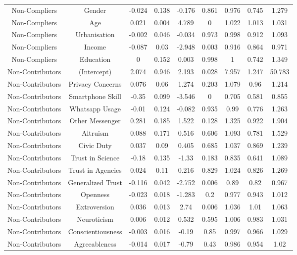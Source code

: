 \begin{table}[!htbp]
\begin{tabular}{@{\extracolsep{5pt}} ccccccccc}
Non-Compliers & Gender & -0.024 & 0.138 & -0.176 & 0.861 & 0.976 & 0.745 & 1.279 \\ 
Non-Compliers & Age & 0.021 & 0.004 & 4.789 & 0 & 1.022 & 1.013 & 1.031 \\ 
Non-Compliers & Urbanisation & -0.002 & 0.046 & -0.034 & 0.973 & 0.998 & 0.912 & 1.093 \\ 
Non-Compliers & Income & -0.087 & 0.03 & -2.948 & 0.003 & 0.916 & 0.864 & 0.971 \\ 
Non-Compliers & Education & 0 & 0.152 & 0.003 & 0.998 & 1 & 0.742 & 1.349 \\ 
Non-Contributors & (Intercept) & 2.074 & 0.946 & 2.193 & 0.028 & 7.957 & 1.247 & 50.783 \\ 
Non-Contributors & Privacy Concerns & 0.076 & 0.06 & 1.274 & 0.203 & 1.079 & 0.96 & 1.214 \\ 
Non-Contributors & Smartphone Skill & -0.35 & 0.099 & -3.546 & 0 & 0.705 & 0.581 & 0.855 \\ 
Non-Contributors & Whatsapp Usage & -0.01 & 0.124 & -0.082 & 0.935 & 0.99 & 0.776 & 1.263 \\ 
Non-Contributors & Other Messenger & 0.281 & 0.185 & 1.522 & 0.128 & 1.325 & 0.922 & 1.904 \\ 
Non-Contributors & Altruism & 0.088 & 0.171 & 0.516 & 0.606 & 1.093 & 0.781 & 1.529 \\ 
Non-Contributors & Civic Duty & 0.037 & 0.09 & 0.405 & 0.685 & 1.037 & 0.869 & 1.239 \\ 
Non-Contributors & Trust in Science & -0.18 & 0.135 & -1.33 & 0.183 & 0.835 & 0.641 & 1.089 \\ 
Non-Contributors & Trust in Agencies & 0.024 & 0.11 & 0.216 & 0.829 & 1.024 & 0.826 & 1.269 \\ 
Non-Contributors & Generalized Trust & -0.116 & 0.042 & -2.752 & 0.006 & 0.89 & 0.82 & 0.967 \\ 
Non-Contributors & Openness & -0.023 & 0.018 & -1.283 & 0.2 & 0.977 & 0.943 & 1.012 \\ 
Non-Contributors & Extroversion & 0.036 & 0.013 & 2.74 & 0.006 & 1.036 & 1.01 & 1.063 \\ 
Non-Contributors & Neuroticism & 0.006 & 0.012 & 0.532 & 0.595 & 1.006 & 0.983 & 1.031 \\ 
Non-Contributors & Conscientiousness & -0.003 & 0.016 & -0.19 & 0.85 & 0.997 & 0.966 & 1.029 \\ 
Non-Contributors & Agreeableness & -0.014 & 0.017 & -0.79 & 0.43 & 0.986 & 0.954 & 1.02 \\ 

\end{tabular}
\end{table}
